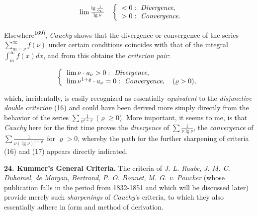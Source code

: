 \thispagestyle{fancy}

\vspace{0.5cm}
 
\vspace{-0.3cm}
\begin{align}
    \raisebox{0ex}{
        \begin{tabular}[b]{l} 
            $\lim \frac{\lg \frac{1}{a_\nu}}{\lg \nu}$ 
        \end{tabular}
        }
    \left\{ 
    \begin{tabular}{l}
    $< 0: \textit{ Divergence},$ \\
    $> 0: \textit{ Convergence}.$
    \end{tabular}
    \right.
\end{align}

Elsewhere\textsuperscript{169)}, \textit{Cauchy} shows that the divergence or convergence of the series $\sum_{m=\nu}^{\infty} f(\nu)$ under certain conditions coincides with that of the integral $\int_m^{\infty} f(x)dx$, and from this obtains the \textit{criterion pair}:

\vspace{-0.3cm}
\begin{align}
    \left\{ 
    \begin{tabular}{l}
    $\lim \nu \cdot a_\nu > 0: \textit{ Divergence},$ \\
    $\lim \nu^{1+\varrho} \cdot a_\nu = 0: \textit{ Convergence}, \quad (\varrho > 0),$
    \end{tabular}
    \right.
\end{align}

which, incidentally, is easily recognized as essentially \textit{equivalent} to the \textit{disjunctive double criterion} (16) and could have been derived more simply directly from the behavior of the series $\sum \frac{1}{\nu^{1+\varrho}}$ ($\varrho \geq 0$). More important, it seems to me, is that \textit{Cauchy} here for the first time proves the \textit{divergence} of $\sum \frac{1}{\nu \lg \nu}$, the \textit{convergence} of $\sum \frac{1}{\nu (\lg \nu)^{1+\varrho}}$ for $\varrho > 0$, whereby the path for the further sharpening of criteria (16) and (17) appears directly indicated.

\vspace{0.3cm}
\textbf{24. Kummer's General Criteria.} The criteria of \textit{J. L. Raabe}, \textit{J. M. C. Duhamel}, \textit{de Morgan}, \textit{Bertrand}, \textit{P. O. Bonnet}, \textit{M. G. v. Paucker} (whose publication falls in the period from 1832-1851 and which will be discussed later) provide merely such \textit{sharpenings} of \textit{Cauchy}'s criteria, to which they also essentially adhere in form and method of derivation.

